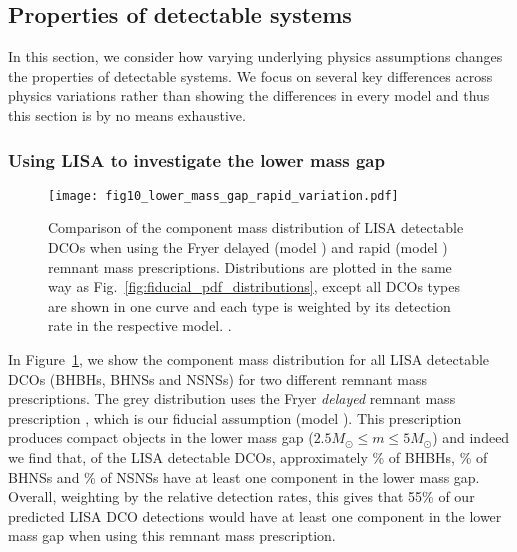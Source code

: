 \subsection{Properties of detectable systems}\label{sec:property_variations}

In this section, we consider how varying underlying physics assumptions changes the properties of detectable systems. We focus on several key differences across physics variations rather than showing the differences in every model and thus this section is by no means exhaustive.

\subsubsection{Using LISA to investigate the lower mass gap}\label{sec:lower_mass_gap}

\begin{figure}[tb]
    \centering
    \texttt{[image: fig10\_lower\_mass\_gap\_rapid\_variation.pdf]}
    \caption{Comparison of the component mass distribution of LISA detectable DCOs when using the Fryer delayed (model \modFid{}) and rapid (model \modRapid{}) remnant mass prescriptions. Distributions are plotted in the same way as Fig.~\ref{fig:fiducial_pdf_distributions}, except all DCOs types are shown in one curve and each type is weighted by its detection rate in the respective model. \href{https://github.com/TomWagg/detecting-DCOs-in-LISA/blob/main/paper/figures/fig10_lower_mass_gap_rapid_variation.pdf}{\faFileImage} \href{https://github.com/TomWagg/detecting-DCOs-in-LISA/blob/main/paper/figure_notebooks/variations.ipynb}{\faBook}.}
    \label{fig:lower_mass_gap_variation}
\end{figure}

In Figure~\ref{fig:lower_mass_gap_variation}, we show the component mass distribution for all LISA detectable DCOs (BHBHs, BHNSs and NSNSs) for two different remnant mass prescriptions. The grey distribution uses the Fryer \textit{delayed} remnant mass prescription \citep{Fryer+2012}, which is our fiducial assumption (model \modFid{}). This prescription produces compact objects in the lower mass gap ($2.5 \unit{M_{\odot}} \le m \le 5 \unit{M_{\odot}}$) and indeed we find that, of the LISA detectable DCOs, approximately \BHBHatLeastOneLowerMassGapPerc{}\% of BHBHs, \BHNSatLeastOneLowerMassGapPerc{}\% of BHNSs and \NSNSatLeastOneLowerMassGapPerc{}\% of NSNSs have at least one component in the lower mass gap. Overall, weighting by the relative detection rates, this gives that 55\% of our predicted LISA DCO detections would have at least one component in the lower mass gap when using this remnant mass prescription.

